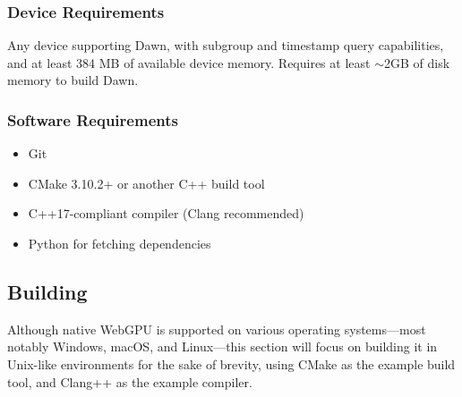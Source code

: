 \documentclass[sigconf]{acmart}
\begin{document}
\subsubsection{Device Requirements}
Any device supporting Dawn, with subgroup and timestamp query capabilities, and at least 384 MB of available device memory. Requires at least $\sim$2GB of disk memory to build Dawn.

\subsubsection{Software Requirements}
\begin{itemize}
  \item Git
  \item CMake 3.10.2+ or another C++ build tool
  \item C++17-compliant compiler (Clang recommended)
  \item Python for fetching dependencies
\end{itemize}

\subsection{Building}
Although native WebGPU is supported on various operating systems—most notably Windows, macOS, and Linux—this section will focus on building it in Unix-like environments for the sake of brevity, using CMake as the example build tool, and Clang++ as the example compiler.
\end{document}

